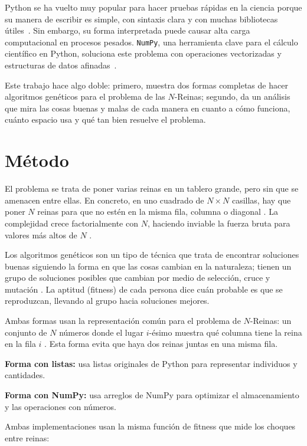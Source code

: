 \documentclass[journal]{IEEEtran}
\begin{document}
Python se ha vuelto muy popular para hacer pruebas rápidas en la ciencia porque su manera de escribir es simple, con sintaxis clara y con muchas bibliotecas útiles~\cite{hunter2007}. Sin embargo, su forma interpretada puede causar alta carga computacional en procesos pesados. \texttt{NumPy}, una herramienta clave para el cálculo científico en Python, soluciona este problema con operaciones vectorizadas y estructuras de datos afinadas~\cite{harris2020}.  

Este trabajo hace algo doble: primero, muestra dos formas completas de hacer algoritmos genéticos para el problema de las $N$-Reinas; segundo, da un análisis que mira las cosas buenas y malas de cada manera en cuanto a cómo funciona, cuánto espacio usa y qué tan bien resuelve el problema.



\section{Método} \label{sec:método}
El problema se trata de poner varias reinas en un tablero grande, pero sin que se amenacen entre ellas. En concreto, en uno cuadrado de $N \times N$ casillas, hay que poner $N$ reinas para que no estén en la misma fila, columna o diagonal \cite{dijkstra1959note}.  
La complejidad crece factorialmente con $N$, haciendo inviable la fuerza bruta para valores más altos de $N$ \cite{moon1999genetic}.  

Los algoritmos genéticos son un tipo de técnica que trata de encontrar soluciones buenas siguiendo la forma en que las cosas cambian en la naturaleza; tienen un grupo de soluciones posibles que cambian por medio de selección, cruce y mutación \cite{goldberg1989genetic}. La aptitud (fitness) de cada persona dice cuán probable es que se reproduzcan, llevando al grupo hacia soluciones mejores.  

Ambas formas usan la representación común para el problema de $N$-Reinas: un conjunto de $N$ números donde el lugar $i$-ésimo muestra qué columna tiene la reina en la fila $i$ \cite{takefuji1991artificial}. Esta forma evita que haya dos reinas juntas en una misma fila.  

\textbf{Forma con listas:} usa listas originales de Python para representar individuos y cantidades. 

\textbf{Forma con NumPy:} usa arreglos de NumPy para optimizar el almacenamiento y las operaciones con números.  

Ambas implementaciones usan la misma función de fitness que mide los choques entre reinas:
\end{document}
